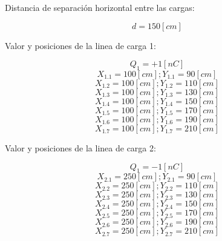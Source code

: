 \documentclass[letter,11pt]{article}
\begin{document}
Distancia de separación horizontal entre las cargas:

\begin{equation*}
    d = 150 [cm]
\end{equation*}

Valor y posiciones de la linea de carga 1:

\begin{equation*}
    Q_1 = +1 [nC]
\end{equation*}
\begin{equation*}
    X_{1.1} = 100 [cm]; Y_{1.1} = 90 [cm]
\end{equation*}
\begin{equation*}
    X_{1.2} = 100 [cm]; Y_{1.2} = 110 [cm]
\end{equation*}
\begin{equation*}
    X_{1.3} = 100 [cm]; Y_{1.3} = 130 [cm]
\end{equation*}
\begin{equation*}
    X_{1.4} = 100 [cm]; Y_{1.4} = 150 [cm]
\end{equation*}
\begin{equation*}
    X_{1.5} = 100 [cm]; Y_{1.5} = 170 [cm]
\end{equation*}
\begin{equation*}
    X_{1.6} = 100 [cm]; Y_{1.6} = 190 [cm]
\end{equation*}
\begin{equation*}
    X_{1.7} = 100 [cm]; Y_{1.7} = 210 [cm]
\end{equation*}

Valor y posiciones de la linea de carga 2:

\begin{equation*}
    Q_1 = -1 [nC]
\end{equation*}
\begin{equation*}
    X_{2.1} = 250 [cm]; Y_{2.1} = 90 [cm]
\end{equation*}
\begin{equation*}
    X_{2.2} = 250 [cm]; Y_{2.2} = 110 [cm]
\end{equation*}
\begin{equation*}
    X_{2.3} = 250 [cm]; Y_{2.3} = 130 [cm]
\end{equation*}
\begin{equation*}
    X_{2.4} = 250 [cm]; Y_{2.4} = 150 [cm]
\end{equation*}
\begin{equation*}
    X_{2.5} = 250 [cm]; Y_{2.5} = 170 [cm]
\end{equation*}
\begin{equation*}
    X_{2.6} = 250 [cm]; Y_{2.6} = 190 [cm]
\end{equation*}
\begin{equation*}
    X_{2.7} = 250 [cm]; Y_{2.7} = 210 [cm]
\end{equation*}
\end{document}
